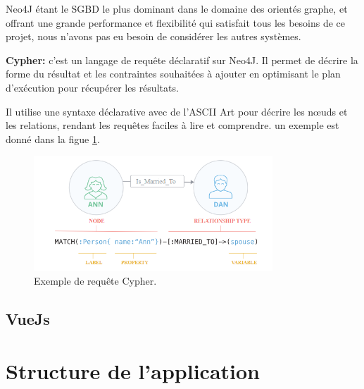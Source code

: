 Neo4J étant le SGBD le plus dominant dans le domaine des orientés graphe, et offrant une grande performance et flexibilité qui satisfait tous les besoins de ce projet, nous n'avons pas eu besoin de considérer les autres systèmes.

\textbf{Cypher: } c'est un langage de requête déclaratif sur Neo4J. Il permet de décrire la forme du résultat et les contraintes souhaitées à ajouter en optimisant le plan d'exécution pour récupérer les résultats.\newline

Il utilise une syntaxe déclarative avec de l'ASCII Art pour décrire les nœuds et les relations, rendant les requêtes faciles à lire et comprendre. un exemple est donné dans la figue \ref{fig:cypher}.

\begin{figure}
	\center
	\includegraphics[width=0.8\textwidth]{img/cypher.png}
	\caption{Exemple de requête Cypher.}
	\label{fig:cypher}

\end{figure}
\newpage
\subsection{VueJs}
\newpage
\section{Structure de l'application}
